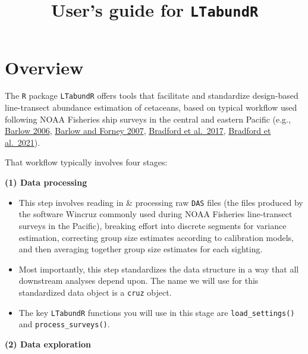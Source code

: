 \documentclass[
]{book}
\title{User's guide for \texttt{LTabundR}}
\author{}
\date{\vspace{-2.5em}}
\begin{document}
\maketitle

{
\setcounter{tocdepth}{1}
\tableofcontents
}
\hypertarget{overview}{%
\chapter*{Overview}\label{overview}}

The \texttt{R} package \texttt{LTabundR} offers tools that facilitate and standardize design-based line-transect abundance estimation of cetaceans, based on typical workflow used following NOAA Fisheries ship surveys in the central and eastern Pacific (e.g., \href{https://www.google.com/url?q=https://onlinelibrary.wiley.com/doi/10.1111/j.1748-7692.2006.00032.x\&sa=D\&source=docs\&ust=1676392605333708\&usg=AOvVaw07ERYd9m2kJg0LttBFVyil}{Barlow 2006}, \href{https://spo.nmfs.noaa.gov/content/abundance-and-population-density-cetaceans-california-current-ecosystem}{Barlow and Forney 2007}, \href{https://spo.nmfs.noaa.gov/content/fishery-bulletin/abundance-estimates-cetaceans-line-transect-survey-within-us-hawaiian}{Bradford et al.~2017}, \href{https://repository.library.noaa.gov/view/noaa/29004}{Bradford et al.~2021}).

That workflow typically involves four stages:

\textbf{(1) Data processing}

\begin{itemize}
\item
  This step involves reading in \& processing raw \texttt{DAS} files (the files produced by the software Wincruz commonly used during NOAA Fisheries line-transect surveys in the Pacific), breaking effort into discrete segments for variance estimation, correcting group size estimates according to calibration models, and then averaging together group size estimates for each sighting.
\item
  Most importantly, this step standardizes the data structure in a way that all downstream analyses depend upon. The name we will use for this standardized data object is a \texttt{cruz} object.
\item
  The key \texttt{LTabundR} functions you will use in this stage are \texttt{load\_settings()} and \texttt{process\_surveys()}.
\end{itemize}

\textbf{(2) Data exploration}
\end{document}
